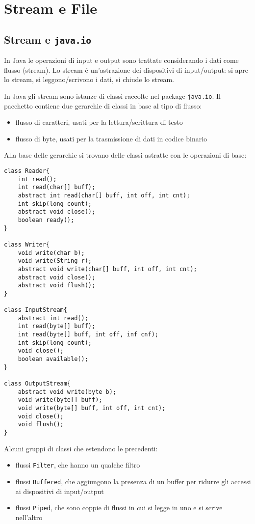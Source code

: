 \chapter{Stream e File}


\section{Stream e \texttt{java.io}}
In Java le operazioni di input e output sono trattate considerando i dati come flusso (stream). Lo stream é un'astrazione dei dispositivi di input/output: si apre lo stream, si leggono/scrivono i dati, si chiude lo stream.

In Java gli stream sono istanze di classi raccolte nel package \texttt{java.io}. Il pacchetto contiene due gerarchie di classi in base al tipo di flusso:
\begin{itemize}
 \item flusso di caratteri, usati per la lettura/scrittura di testo
 \item flusso di byte, usati per la trasmissione di dati in codice binario
\end{itemize}

Alla base delle gerarchie si trovano delle classi astratte con le operazioni di base:

\begin{verbatim}
class Reader{
	int read();
	int read(char[] buff);
	abstract int read(char[] buff, int off, int cnt);
	int skip(long count);
	abstract void close();
	boolean ready();
}

class Writer{
	void write(char b);
	void write(String r);
	abstract void write(char[] buff, int off, int cnt);
	abstract void close();
	abstract void flush();
}

class InputStream{
	abstract int read();
	int read(byte[] buff);
	int read(byte[] buff, int off, inf cnf);
	int skip(long count);
	void close();
	boolean available();
}

class OutputStream{
	abstract void write(byte b);
	void write(byte[] buff);
	void write(byte[] buff, int off, int cnt);
	void close();
	void flush();
}
\end{verbatim}

Alcuni gruppi di classi che estendono le precedenti:
\begin{itemize}
\item flussi \texttt{Filter}, che hanno un qualche filtro
\item flussi \texttt{Buffered}, che aggiungono la presenza di un buffer per ridurre gli accessi ai dispositivi di input/output
\item flussi \texttt{Piped}, che sono coppie di flussi in cui si legge in uno e si scrive nell'altro
\end{itemize}

